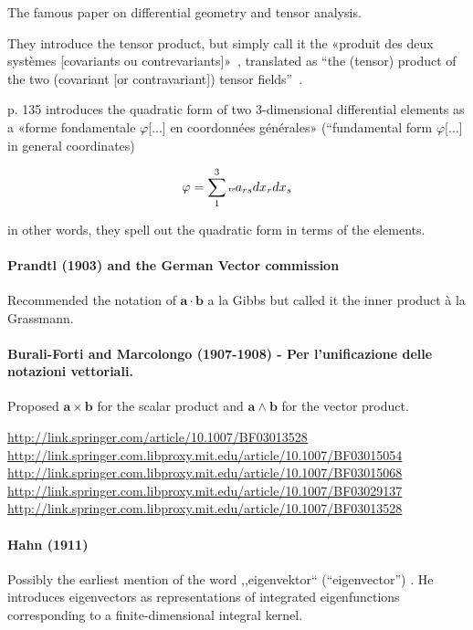 The famous paper on differential geometry and tensor analysis.

They introduce the tensor product, but simply call it the
«produit des deux systèmes [covariants ou contrevariants]»~\cite[p. 133]{Ricci1900}, translated as
``the (tensor) product of the two (covariant [or contravariant]) tensor fields''~\cite[p. 28]{Hermann1975}.

p. 135 introduces the quadratic form of two 3-dimensional differential elements as a «forme fondamentale $\varphi$[...] en coordonnées générales» (``fundamental form $\varphi$[...] in general coordinates)

\[
\varphi = \sum_1^3 \text{\tiny{rs}} a_{rs} dx_r dx_s
\]

in other words, they spell out the quadratic form in terms of the elements.



\paragraph{Prandtl (1903) and the German Vector commission}

Recommended the notation of $\mathbf{a} \cdot \mathbf{b}$ a la Gibbs but called it the inner product à la Grassmann.



\paragraph{Burali-Forti and Marcolongo (1907-1908) - Per l’unificazione delle notazioni vettoriali.}

Proposed $\mathbf{a}\times\mathbf{b}$ for the scalar product and  $\mathbf{a}\wedge\mathbf{b}$ for the vector product.

\url{http://link.springer.com/article/10.1007/BF03013528}
\url{http://link.springer.com.libproxy.mit.edu/article/10.1007/BF03015054}
\url{http://link.springer.com.libproxy.mit.edu/article/10.1007/BF03015068}
\url{http://link.springer.com.libproxy.mit.edu/article/10.1007/BF03029137}
\url{http://link.springer.com.libproxy.mit.edu/article/10.1007/BF03013528}


\paragraph{Hahn (1911)~\cite{Hahn1911}}

Possibly the earliest mention of the word ,,eigenvektor`` (``eigenvector'') \cite[p. 35]{Hahn1911}.
He introduces eigenvectors as representations of integrated eigenfunctions corresponding to a finite-dimensional integral kernel.



